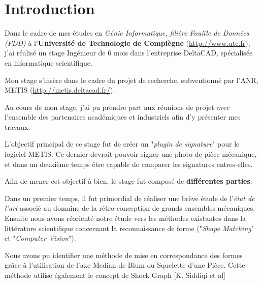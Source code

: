 \chapter*{Introduction}

Dans le cadre de mes études en \emph{Génie Informatique, filière Fouille de Données (FDD)} à l'\textbf{Université de Technologie de Compiègne} (\url{http://www.utc.fr}), j'ai réalisé un stage Ingénieur de 6 mois dans l'entreprise DeltaCAD, spécialisée en informatique scientifique. 


Mon stage s'insère dans le cadre du projet de recherche, subventionné par l'ANR, METIS (\url{http://metis.deltacad.fr/}).

Au cours de mon stage, j'ai pu prendre part aux réunions de projet avec l'ensemble des partenaires académiques et industriels afin d'y présenter mes travaux.

L'objectif principal de ce stage fut de créer un "\textit{plugin de signature}" pour le logiciel METIS. Ce dernier devrait pouvoir signer une photo de pièce mécanique, et dans un deuxième temps être capable de comparer les signatures entres-elles.

Afin de mener cet objectif à bien, le stage fut composé de \textbf{différentes parties}.

Dans un premier temps, il fut primordial de réaliser une brève étude de l'\textit{état de l'art} associé au domaine de la rétro-conception de grands ensembles mécaniques.
Ensuite nous avons réorienté notre étude vers les méthodes existantes dans la littérature scientifique concernant la reconnaissance de forme ("\textit{Shape Matching}" et "\textit{Computer Vision}").

Nous avons pu identifier une méthode de mise en correspondance des formes grâce à l'utilisation de l'axe Median de Blum ou Squelette d'une Pièce. Cette méthode utilise également le concept de Shock Graph [K. Siddiqi et al]~\cite[K. Siddiqi et al]{Siddiqi1999}








































